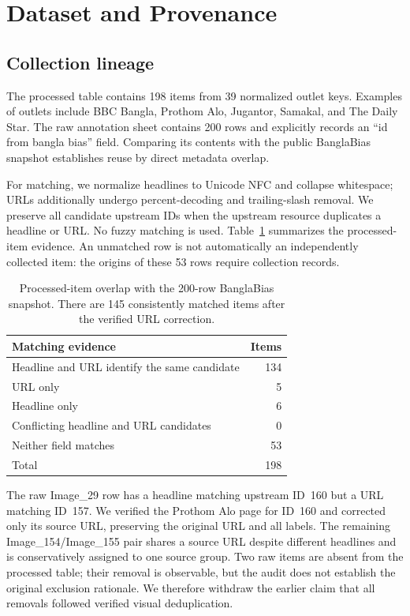\documentclass[11pt]{article}
\begin{document}
\section{Dataset and Provenance}\label{sec:dataset}
\subsection{Collection lineage}
The processed table contains 198 items from 39 normalized outlet keys. Examples of outlets include BBC Bangla, Prothom Alo, Jugantor, Samakal, and The Daily Star. The raw annotation sheet contains 200 rows and explicitly records an ``id from bangla bias'' field. Comparing its contents with the public BanglaBias snapshot establishes reuse by direct metadata overlap.

For matching, we normalize headlines to Unicode NFC and collapse whitespace; URLs additionally undergo percent-decoding and trailing-slash removal. We preserve all candidate upstream IDs when the upstream resource duplicates a headline or URL. No fuzzy matching is used. Table~\ref{tab:provenance} summarizes the processed-item evidence. An unmatched row is not automatically an independently collected item: the origins of these 53 rows require collection records.

\begin{table}[t]
\centering
\small
\begin{tabular}{lr}
\toprule
Matching evidence & Items \\
\midrule
Headline and URL identify the same candidate & 134 \\
URL only & 5 \\
Headline only & 6 \\
Conflicting headline and URL candidates & 0 \\
Neither field matches & 53 \\
\midrule
Total & 198 \\
\bottomrule
\end{tabular}
\caption{Processed-item overlap with the 200-row BanglaBias snapshot. There are 145 consistently matched items after the verified URL correction.}\label{tab:provenance}
\end{table}

The raw Image\_29 row has a headline matching upstream ID~160 but a URL matching ID~157. We verified the Prothom Alo page for ID~160 and corrected only its source URL, preserving the original URL and all labels. The remaining Image\_154/Image\_155 pair shares a source URL despite different headlines and is conservatively assigned to one source group. Two raw items are absent from the processed table; their removal is observable, but the audit does not establish the original exclusion rationale. We therefore withdraw the earlier claim that all removals followed verified visual deduplication.
\end{document}
